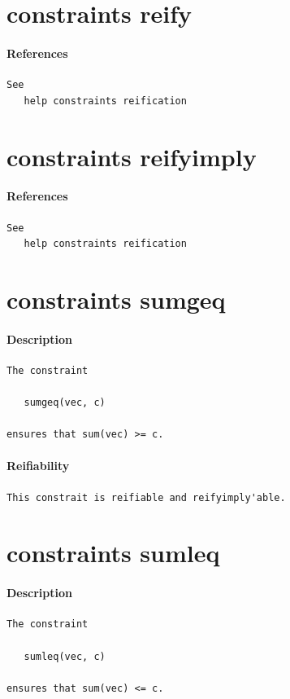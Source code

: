 \documentclass[oneside]{book}
\begin{document}
\section{constraints reify}
\paragraph{References}
{\footnotesize
\begin{verbatim}
See
   help constraints reification
\end{verbatim}
}
\section{constraints reifyimply}
\paragraph{References}
{\footnotesize
\begin{verbatim}
See
   help constraints reification
\end{verbatim}
}
\section{constraints sumgeq}
\paragraph{Description}
{\footnotesize
\begin{verbatim}
The constraint

   sumgeq(vec, c)

ensures that sum(vec) >= c.
\end{verbatim}
}
\paragraph{Reifiability}
{\footnotesize
\begin{verbatim}
This constrait is reifiable and reifyimply'able.
\end{verbatim}
}
\section{constraints sumleq}
\paragraph{Description}
{\footnotesize
\begin{verbatim}
The constraint

   sumleq(vec, c)

ensures that sum(vec) <= c.
\end{verbatim}
}
\end{document}
